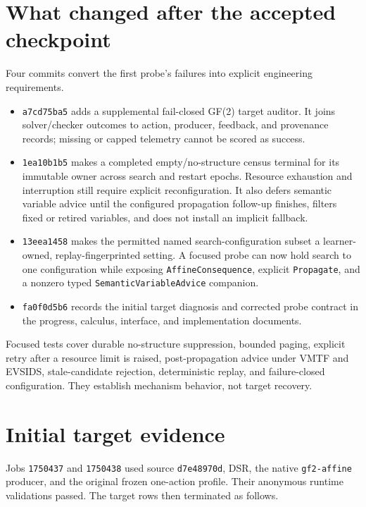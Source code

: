 \documentclass[11pt]{article}
\newcommand{\code}[1]{\texttt{#1}}
\begin{document}
\section*{What changed after the accepted checkpoint}

Four commits convert the first probe's failures into explicit engineering
requirements.

\begin{itemize}
\item \code{a7cd75ba5} adds a supplemental fail-closed GF(2) target auditor.  It
joins solver/checker outcomes to action, producer, feedback, and provenance
records; missing or capped telemetry cannot be scored as success.
\item \code{1ea10b1b5} makes a completed empty/no-structure census terminal for
its immutable owner across search and restart epochs.  Resource exhaustion and
interruption still require explicit reconfiguration.  It also defers semantic
variable advice until the configured propagation follow-up finishes, filters
fixed or retired variables, and does not install an implicit fallback.
\item \code{13eea1458} makes the permitted named search-configuration subset a
learner-owned, replay-fingerprinted setting.  A focused probe can now hold
search to one configuration while exposing \code{AffineConsequence}, explicit
\code{Propagate}, and a nonzero typed \code{SemanticVariableAdvice} companion.
\item \code{fa0f0d5b6} records the initial target diagnosis and corrected probe
contract in the progress, calculus, interface, and implementation documents.
\end{itemize}

Focused tests cover durable no-structure suppression, bounded paging, explicit
retry after a resource limit is raised, post-propagation advice under VMTF and
EVSIDS, stale-candidate rejection, deterministic replay, and failure-closed
configuration.  They establish mechanism behavior, not target recovery.

\section*{Initial target evidence}

Jobs \code{1750437} and \code{1750438} used source \code{d7e48970d}, DSR, the
native \code{gf2-affine} producer, and the original frozen one-action profile.
Their anonymous runtime validations passed.  The target rows then terminated as
follows.
\end{document}
